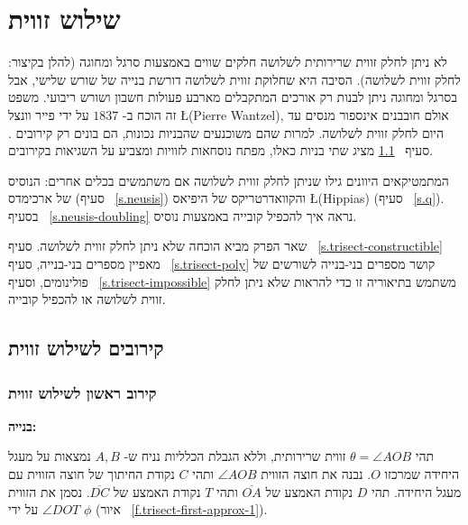 

\chapter{שילוש זווית}
\label{c.trisect}

לא ניתן לחלק זווית שרירותית לשלושה חלקים שווים באמצעות סרגל ומחוגה (להלן בקיצור: לחלק זווית לשלושה). הסיבה היא שחלוקת זווית לשלושה דורשת בנייה של שורש שלישי, אבל בסרגל ומחוגה ניתן לבנות רק אורכים המתקבלים מארבע פעולות חשבון ושורש ריבועי. משפט זה הוכח ב-%
$1837$
על ידי פייר וונצל
\L{(Pierre Wantzel)},
אולם חובבנים אינספור מנסים עד היום לחלק זווית לשלושה. למרות שהם משוכנעים שהבניות נכונות, הם בונים רק קירובים . סעיף%
~\ref{s.trisect-approx}
מציג שתי בניות כאלו, מפתח נוסחאות לזוויות ומצביע על השגיאות בקירובים.

המתמטיקאים היוונים גילו שניתן לחלק זווית לשלושה אם משתמשים בכלים אחרים: הנוסיס 
של ארכימדס
(סעיף%
~\ref{s.neusis})
והקוואדרטריקס
של היפיאס
\L{(Hippias)}
(סעיף%
~\ref{s.q}).
בסעיף%
~\ref{s.neusis-doubling}
נראה איך להכפיל קובייה באמצעות נוסיס.

שאר הפרק מביא הוכחה שלא ניתן לחלק זווית לשלושה. סעיף%
~\ref{s.trisect-constructible}
מאפיין מספרים בני-בנייה, סעיף%
~\ref{s.trisect-poly}
קושר מספרים בני-בנייה לשורשים של פולינומים, וסעיף%
~\ref{s.trisect-impossible}
משתמש בתיאוריה זו כדי להראות שלא ניתן לחלק זווית לשלושה או להכפיל קובייה.



\section{קירובים לשילוש זווית}\label{s.trisect-approx}

\subsection{קירוב ראשון לשילוש זווית}\label{sub.trisect-approx1}

\noindent\textbf{בנייה:}

תהי 
$\theta=\angle AOB$
זווית שרירותית, וללא הגבלת הכלליות נניח ש-%
$A,B$
נמצאות על מעגל היחידה שמרכזו 
$O$.
נבנה את חוצה הזווית 
$\angle AOB$
ותהי 
$C$
נקודת החיתוך של חוצה הזווית עם מעגל היחידה. תהי
$D$
נקודת האמצע של
$\overline{OA}$
ותהי
$T$ 
נקודת האמצע של
$\overline{DC}$.
נסמן את הזווית
$\angle DOT$
על ידי
$\phi$
(איור%
~\ref{f.trisect-first-approx-1}).

